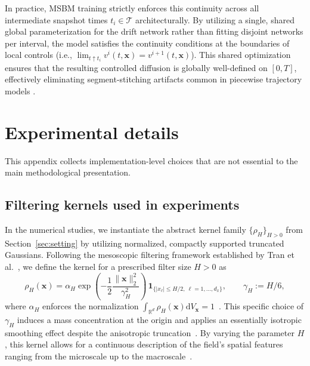 \documentclass[review,onefignum,onetabnum]{siamart250211}
\newcommand{\R}{\mathbb{R}}
\newcommand{\1}{\mathbf{1}}
\begin{document}
In practice, \textsc{MSBM} training strictly enforces this continuity across all intermediate snapshot times $t_i \in \mathcal{T}$ architecturally. By utilizing a single, shared global parameterization for the drift network rather than fitting disjoint networks per interval, the model satisfies the continuity conditions at the boundaries of local controls (i.e., $\lim_{t \uparrow t_i} v^i(t, \mathbf{x}) = v^{i+1}(t, \mathbf{x})$). This shared optimization ensures that the resulting controlled diffusion is globally well-defined on $[0, T]$, effectively eliminating segment-stitching artifacts common in piecewise trajectory models \cite{park2025msbm}.

\section{Experimental details}\label{app:exp_details}
This appendix collects implementation-level choices that are not essential to the main methodological presentation.

\subsection{Filtering kernels used in experiments}\label{app:filter_kernel}
In the numerical studies, we instantiate the abstract kernel family $\{\rho_H\}_{H>0}$ from Section~\ref{sec:setting} by utilizing normalized, compactly supported truncated Gaussians. Following the mesoscopic filtering framework established by Tran et al.~\cite{tran2016stochastic}, we define the kernel for a prescribed filter size $H>0$ as
\begin{equation}
\rho_H(\mathbf{x})=\alpha_H\exp\!\left(-\frac{1}{2}\frac{\|\mathbf{x}\|_2^2}{\gamma_H^2}\right)\,
\mathbf{1}_{\{|x_\ell|\le H/2,\ \ell=1,\dots,d_x\}},
\qquad \gamma_H:=H/6,
\label{eq:trunc_gauss_kernel}
\end{equation}
where $\alpha_H$ enforces the normalization $\int_{\R^d} \rho_H(\mathbf{x}) \mathrm{d} V_{\mathbf{x}} = 1$~\cite{tran2016stochastic}. This specific choice of $\gamma_H$ induces a mass concentration at the origin and applies an essentially isotropic smoothing effect despite the anisotropic truncation~\cite{tran2016stochastic}. By varying the parameter $H$, this kernel allows for a continuous description of the field's spatial features ranging from the microscale up to the macroscale~\cite{tran2016stochastic}.
\end{document}
